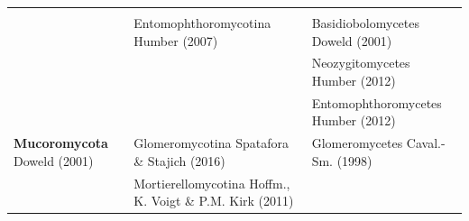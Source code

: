 \documentclass[]{book}
\begin{document}
\begin{longtable}[]{@{}lll@{}}
\begin{minipage}[t]{0.31\columnwidth}
\strut
\end{minipage}\tabularnewline
\begin{minipage}[t]{0.32\columnwidth}\raggedright
\strut
\end{minipage} & \begin{minipage}[t]{0.28\columnwidth}\raggedright
Entomophthoromycotina Humber (2007)\strut
\end{minipage} & \begin{minipage}[t]{0.31\columnwidth}\raggedright
Basidiobolomycetes Doweld (2001)\strut
\end{minipage}\tabularnewline
\begin{minipage}[t]{0.32\columnwidth}\raggedright
\strut
\end{minipage} & \begin{minipage}[t]{0.28\columnwidth}\raggedright
\strut
\end{minipage} & \begin{minipage}[t]{0.31\columnwidth}\raggedright
Neozygitomycetes Humber (2012)\strut
\end{minipage}\tabularnewline
\begin{minipage}[t]{0.32\columnwidth}\raggedright
\strut
\end{minipage} & \begin{minipage}[t]{0.28\columnwidth}\raggedright
\strut
\end{minipage} & \begin{minipage}[t]{0.31\columnwidth}\raggedright
Entomophthoromycetes Humber (2012)\strut
\end{minipage}\tabularnewline
\begin{minipage}[t]{0.32\columnwidth}\raggedright
\textbf{Mucoromycota} Doweld (2001)\strut
\end{minipage} & \begin{minipage}[t]{0.28\columnwidth}\raggedright
Glomeromycotina Spatafora \& Stajich (2016)\strut
\end{minipage} & \begin{minipage}[t]{0.31\columnwidth}\raggedright
Glomeromycetes Caval.-Sm. (1998)\strut
\end{minipage}\tabularnewline
\begin{minipage}[t]{0.32\columnwidth}\raggedright
\strut
\end{minipage} & \begin{minipage}[t]{0.28\columnwidth}\raggedright
Mortierellomycotina Hoffm., K. Voigt \& P.M. Kirk (2011)\strut
\end{minipage} & \begin{minipage}[t]{0.31\columnwidth}\raggedright

\end{minipage}
\end{longtable}
\end{document}
